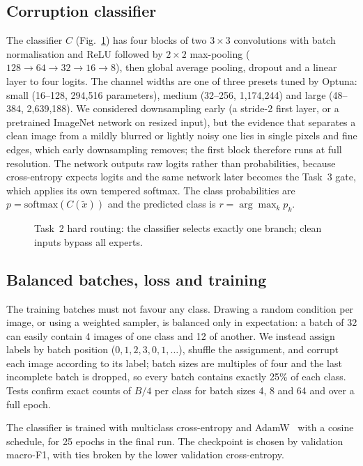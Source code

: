 \documentclass[conference]{IEEEtran}
\begin{document}
\subsection{Corruption classifier}
The classifier $C$ (Fig.~\ref{fig:task2_arch}) has four blocks of two
$3\times3$ convolutions with batch normalisation and ReLU followed by
$2\times2$ max-pooling ($128\to64\to32\to16\to8$), then global average
pooling, dropout and a linear layer to four logits. The channel widths are
one of three presets tuned by Optuna: small (16--128, 294,516 parameters),
medium (32--256, 1,174,244) and large (48--384, 2,639,188). We considered
downsampling early (a stride-2 first layer, or a pretrained ImageNet network
on resized input), but the evidence that separates a clean image from a
mildly blurred or lightly noisy one lies in single pixels and fine edges,
which early downsampling removes; the first block therefore runs at full
resolution. The network outputs raw logits rather than probabilities,
because cross-entropy expects logits and the same network later becomes the
Task~3 gate, which applies its own tempered softmax. The class probabilities
are $p=\mathrm{softmax}(C(\tilde{x}))$ and the predicted class is
$r=\arg\max_k p_k$.

\begin{figure}[t]
\centering

\caption{Task~2 hard routing: the classifier selects exactly one branch;
clean inputs bypass all experts.}
\label{fig:task2_arch}
\end{figure}

\subsection{Balanced batches, loss and training}
The training batches must not favour any class. Drawing a random condition
per image, or using a weighted sampler, is balanced only in expectation: a
batch of 32 can easily contain 4 images of one class and 12 of another. We
instead assign labels by batch position ($0,1,2,3,0,1,\dots$), shuffle the
assignment, and corrupt each image according to its label; batch sizes are
multiples of four and the last incomplete batch is dropped, so every batch
contains exactly 25\% of each class. Tests confirm exact counts of $B/4$ per
class for batch sizes 4, 8 and 64 and over a full epoch.

The classifier is trained with multiclass cross-entropy and
AdamW~\cite{loshchilov2019decoupled} with a cosine schedule, for 25 epochs in
the final run. The checkpoint is chosen by validation macro-F1, with ties
broken by the lower validation cross-entropy.
\end{document}
